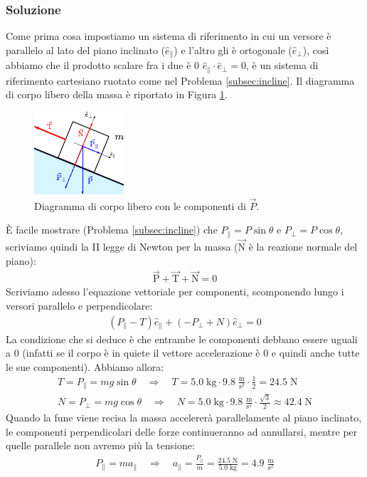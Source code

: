 \documentclass[12pt,a4paper]{book}
\begin{document}
\subsubsection*{Soluzione}
Come prima cosa impostiamo un sistema di riferimento in cui un versore è parallelo al lato del piano inclinato ($\hat{e}_\parallel$) e l'altro gli è ortogonale ($\hat{e}_\perp$), così abbiamo che il prodotto scalare fra i due è 0 $\hat{e}_\parallel\cdot\hat{e}_\perp=0$, è un sistema di riferimento cartesiano ruotato come nel Problema \ref{subsec:incline}. Il diagramma di corpo libero della massa è riportato in Figura \ref{fig:4-e-8-2}.

\begin{figure}[!ht]
\centering
\includegraphics[scale=3]{e-8-2.pdf}
\caption{Diagramma di corpo libero con le componenti di $\vec{P}$.} 
\label{fig:4-e-8-2} 
\end{figure}

È facile mostrare (Problema \ref{subsec:incline}) che $P_\parallel=P\sin\theta$ e $P_\perp=P\cos\theta$, scriviamo quindi la II legge di Newton per la massa ($\vec{\text{N}}$ è la reazione normale del piano):
%
\begin{gather*}
\vec{\text{P}}+\vec{\text{T}}+\vec{\text{N}}=0
\end{gather*}
%
Scriviamo adesso l'equazione vettoriale per componenti, scomponendo lungo i versori parallelo e perpendicolare:
%
\begin{gather*}
(P_\parallel-T)\hat{e}_\parallel + (-P_\perp+N)\hat{e}_\perp=0
\end{gather*}
%
La condizione che si deduce è che entrambe le componenti debbano essere uguali a 0 (infatti se il corpo è in quiete il vettore accelerazione è 0 e quindi anche tutte le sue componenti). Abbiamo allora:
%
\begin{gather*}
T=P_\parallel=mg\sin\theta \quad \Longrightarrow \quad T=5.0\;\text{kg}\cdot 9.8\;\frac{\text{m}}{\text{s}^2}\cdot \frac{1}{2} = 24.5\;\text{N} \\
N=P_\perp=mg\cos\theta \quad \Longrightarrow \quad N=5.0\;\text{kg}\cdot 9.8\;\frac{\text{m}}{\text{s}^2}\cdot \frac{\sqrt{3}}{2} \approx 42.4\;\text{N}
\end{gather*}
%
Quando la fune viene recisa la massa accelererà parallelamente al piano inclinato, le componenti perpendicolari delle forze continueranno ad annullarsi, mentre per quelle parallele non avremo più la tensione:
%
\begin{gather*}
P_\parallel=ma_\parallel \quad \Longrightarrow \quad a_\parallel=\frac{P_\parallel}{m}=\frac{24.5\;\text{N}}{5.0\;\text{kg}}=4.9\;\frac{\text{m}}{\text{s}^2}
\end{gather*}
%
\end{document}
